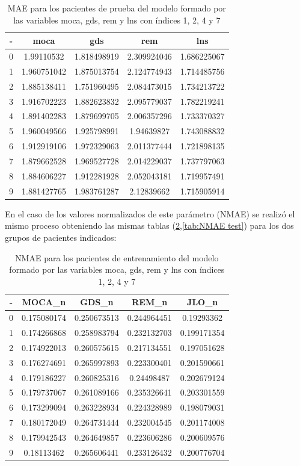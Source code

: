 \begin{table}[htbp]
	\centering
	\begin{tabular}{|c|c|c|c|c|}
		\hline
		- & moca & gds & rem & lns \\
		\hline
		0 & 1.99110532 & 1.818498919 & 2.309924046 & 1.686225067 \\
		1 & 1.960751042 & 1.875013754 & 2.124774943 & 1.714485756 \\
		2 & 1.885138411 & 1.751960495 & 2.084473015 & 1.734213722 \\
		3 & 1.916702223 & 1.882623832 & 2.095779037 & 1.782219241 \\
		4 & 1.891402283 & 1.879699705 & 2.006357296 & 1.733370327 \\
		5 & 1.960049566 & 1.925798991 & 1.94639827 & 1.743088832 \\
		6 & 1.912919106 & 1.972329063 & 2.011377444 & 1.721898135 \\
		7 & 1.879662528 & 1.969527728 & 2.014229037 & 1.737797063 \\
		8 & 1.884606227 & 1.912281928 & 2.052043181 & 1.719957491 \\
		9 & 1.881427765 & 1.983761287 & 2.12839662 & 1.715905914 \\
		\hline
	\end{tabular}
	\caption{MAE para los pacientes de prueba del modelo formado por las variables moca, gds, rem y lns con índices 1, 2, 4 y 7}
	\label{tab:mae test}
\end{table}

En el caso de los valores normalizados de este parámetro (NMAE) se realizó el mismo proceso obteniendo las mismas tablas (\ref{tab:NMAE train},\ref{tab:NMAE test}) para los dos grupos de pacientes indicados: 

\begin{table}[htbp]
	\centering
	\begin{tabular}{|c|c|c|c|c|}
		\hline
		-& MOCA\_n & GDS\_n & REM\_n & JLO\_n \\
		\hline
		0 & 0.175080174 & 0.250673513 & 0.244964451 & 0.19293362 \\
		1 & 0.174266868 & 0.258983794 & 0.232132703 & 0.199171354 \\
		2 & 0.174922013 & 0.260575615 & 0.217134551 & 0.197051628 \\
		3 & 0.176274691 & 0.265997893 & 0.223300401 & 0.201590661 \\
		4 & 0.179186227 & 0.260825316 & 0.24498487 & 0.202679124 \\
		5 & 0.179737067 & 0.261089166 & 0.235326641 & 0.203301559 \\
		6 & 0.173299094 & 0.263228934 & 0.224328989 & 0.198079031 \\
		7 & 0.180172049 & 0.264731444 & 0.232004545 & 0.201174008 \\
		8 & 0.179942543 & 0.264649857 & 0.223606286 & 0.200609576 \\
		9 & 0.18113462 & 0.265606441 & 0.233126432 & 0.200776704 \\
		\hline
	\end{tabular}
	\caption{NMAE para los pacientes de entrenamiento del modelo formado por las variables moca, gds, rem y lns con índices 1, 2, 4 y 7}
	\label{tab:NMAE train}
\end{table}

